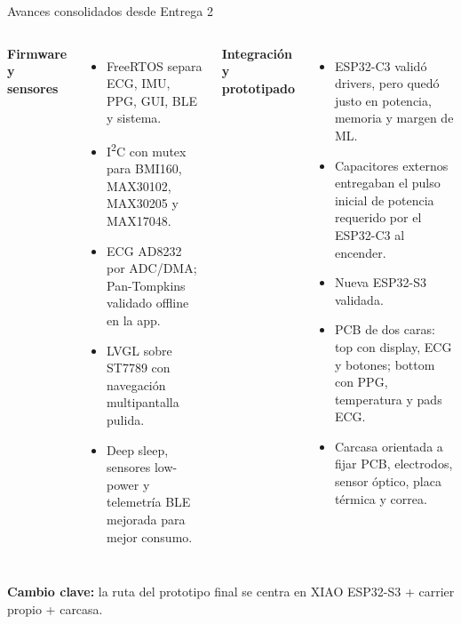\documentclass[aspectratio=169, 10pt]{beamer}
\begin{document}
\begin{frame}{Avances consolidados desde Entrega 2}
    \begin{columns}[T]
        \scriptsize
        \textbf{Firmware y sensores}
        \begin{itemize}\itemsep0.03cm
            \item FreeRTOS separa ECG, IMU, PPG, GUI, BLE y sistema.
            \item I\textsuperscript{2}C con mutex para BMI160, MAX30102, MAX30205 y MAX17048.
            \item ECG AD8232 por ADC/DMA; Pan-Tompkins validado offline en la app.
            \item LVGL sobre ST7789 con navegaci\'on multipantalla pulida.
            \item Deep sleep, sensores low-power y telemetr\'ia BLE mejorada para mejor consumo.
        \end{itemize}
        \scriptsize
        \textbf{Integraci\'on y prototipado}
        \begin{itemize}\itemsep0.03cm
            \item ESP32-C3 valid\'o drivers, pero qued\'o justo en potencia, memoria y margen de ML.
            \item Capacitores externos entregaban el pulso inicial de potencia requerido por el ESP32-C3 al encender.
            \item Nueva ESP32-S3 validada.
            \item PCB de dos caras: top con display, ECG y botones; bottom con PPG, temperatura y pads ECG.
            \item Carcasa orientada a fijar PCB, electrodos, sensor \'optico, placa t\'ermica y correa.
        \end{itemize}
    \end{columns}
    \vspace{0.12cm}
    {\scriptsize\textbf{Cambio clave:} la ruta del prototipo final se centra en XIAO ESP32-S3 + carrier propio + carcasa.}
\end{frame}
\end{document}
